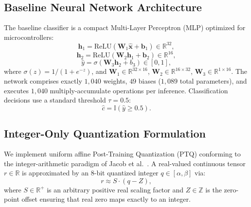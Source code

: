 \subsection{Baseline Neural Network Architecture}
The baseline classifier is a compact Multi-Layer Perceptron (MLP) optimized for microcontrollers:
\begin{equation}
\mathbf{h}_1 = \text{ReLU}(\mathbf{W}_1 \hat{\mathbf{x}} + \mathbf{b}_1) \in \mathbb{R}^{32},
\end{equation}
\begin{equation}
\mathbf{h}_2 = \text{ReLU}(\mathbf{W}_2 \mathbf{h}_1 + \mathbf{b}_2) \in \mathbb{R}^{16},
\end{equation}
\begin{equation}
\hat{y} = \sigma(\mathbf{W}_3 \mathbf{h}_2 + b_3) \in [0, 1],
\end{equation}
where $\sigma(z) = 1 / (1 + e^{-z})$, and $\mathbf{W}_1 \in \mathbb{R}^{32 \times 16}$, $\mathbf{W}_2 \in \mathbb{R}^{16 \times 32}$, $\mathbf{W}_3 \in \mathbb{R}^{1 \times 16}$. The network comprises exactly $1,040$ weights, $49$ biases ($1,089$ total parameters), and executes $1,040$ multiply-accumulate operations per inference. Classification decisions use a standard threshold $\tau = 0.5$:
\begin{equation}
\hat{c} = \mathbb{I}(\hat{y} \ge 0.5).
\end{equation}

\subsection{Integer-Only Quantization Formulation}
We implement uniform affine Post-Training Quantization (PTQ) conforming to the integer-arithmetic paradigm of Jacob et al.~\cite{jacob2018quantization}. A real-valued continuous tensor $r \in \mathbb{R}$ is approximated by an 8-bit quantized integer $q \in [\alpha, \beta]$ via:
\begin{equation}
r \approx S \cdot (q - Z),
\label{eq:quant}
\end{equation}
where $S \in \mathbb{R}^+$ is an arbitrary positive real scaling factor and $Z \in \mathbb{Z}$ is the zero-point offset ensuring that real zero maps exactly to an integer.

